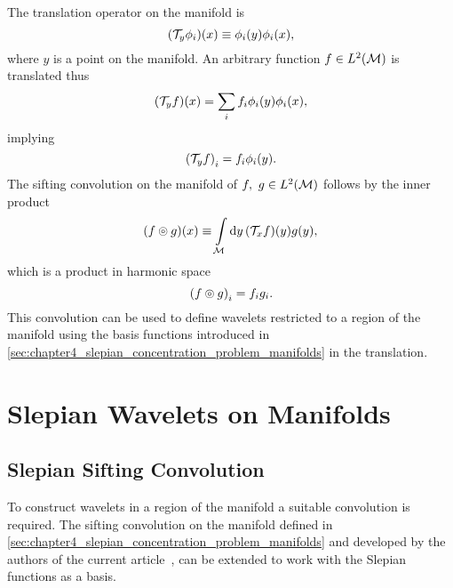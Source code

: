 The translation operator on the manifold is
%
\begin{equation}
	(\mathcal{T}_{y}\phi_{i})(x)
	\equiv \phi_{i}(y) \phi_{i}(x),
\end{equation}
%
where \(y\) is a point on the manifold.
An arbitrary function \(f \in L^{2}(\mathcal{M})\) is translated thus
%
\begin{equation}
	(\mathcal{T}_{y}f)(x)
	= \sum\limits_{i} f_{i} \phi_{i}(y) \phi_{i}(x),
\end{equation}
%
implying
%
\begin{equation}
	{(\mathcal{T}_{y}f)}_{i}
	= f_{i} \phi_{i}(y).
\end{equation}
%
The sifting convolution on the manifold of \(f,\ g \in L^{2}(\mathcal{M})\) follows by the inner product
%
\begin{equation}
	(f \circledcirc{} g)(x)
	\equiv \int\limits_{\mathcal{M}} \dd{y} (\mathcal{T}_{x}f)(y) g(y),
\end{equation}
%
which is a product in harmonic space
%
\begin{equation}
	{(f \circledcirc{} g)}_{i}
	= f_{i} g_{i}.
\end{equation}
%
This convolution can be used to define wavelets restricted to a region of the manifold using the basis functions introduced in \cref{sec:chapter4_slepian_concentration_problem_manifolds} in the translation.

\section{Slepian Wavelets on Manifolds}

\subsection{Slepian Sifting Convolution}

To construct wavelets in a region of the manifold a suitable convolution is required.
The sifting convolution on the manifold defined in \cref{sec:chapter4_slepian_concentration_problem_manifolds} and developed by the authors of the current article~\cite{Roddy2021}, can be extended to work with the Slepian functions as a basis.

